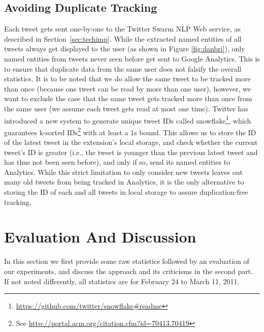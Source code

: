 \documentclass[runningheads,a4paper]{llncs}
\begin{document}
\subsection{Avoiding Duplicate Tracking}
Each tweet gets sent one-by-one to the Twitter Swarm NLP Web service, as described in Section~\ref{sec:techimp}. While the extracted named entities of all tweets always get displayed to the user (as shown in Figure \ref{fig:danbri}), only named entities from tweets never seen before get sent to Google Analytics. This is to ensure that duplicate data from the same user does not falsify the overall statistics. It is to be noted that we do allow the same tweet to be tracked more than once (because one tweet can be read by more than one user), however, we want to exclude the case that the same tweet gets tracked more than once from the same user (we assume each tweet gets read at most one time). Twitter has introduced a new system to generate unique tweet IDs called snowflake\footnote{\url{https://github.com/twitter/snowflake#readme}}, which guarantees k-sorted IDs\footnote{See \url{http://portal.acm.org/citation.cfm?id=70413.70419}} with at least a 1s bound. This allows us to store the ID of the latest tweet in the extension's local storage, and check whether the current tweet's ID is greater (i.e., the tweet is younger than the previous latest tweet and has thus not been seen before), and only if so, send its named entities to Analytics. While this strict limitation to only consider new tweets leaves out many old tweets from being tracked in Analytics, it is the only alternative to storing the ID of each and all tweets in local storage to assure duplication-free tracking.

\section{Evaluation And Discussion}\label{sec:evaluation}
In this section we first provide some raw statistics followed by an evaluation of our experiments, and discuss the approach and its criticisms in the second part. If not noted differently, all statistics are for February 24 to March 11, 2011.
\end{document}
